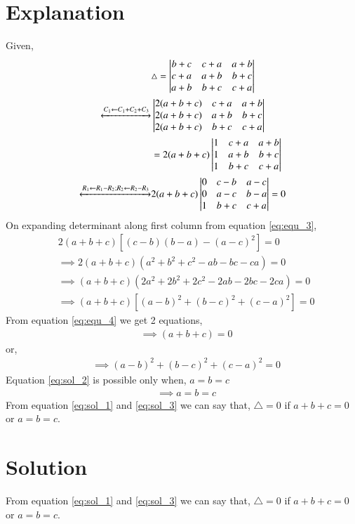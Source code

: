 \documentclass[journal,12pt,twocolumn]{IEEEtran}
\begin{document}
\section{Explanation}
Given,\\
\begin{align}
&\triangle = \begin{vmatrix}b+c & c+a & a+b\\c+a & a+b & b+c\\a+b&b+c & c+a\end{vmatrix} \label{eq:ques}\\
\xleftrightarrow[]{C_1\leftarrow C_1+C_2+C_3}
&\begin{vmatrix}2(a+b+c) & c+a & a+b\\2(a+b+c) & a+b & b+c\\2(a+b+c)&b+c & c+a\end{vmatrix} \label{eq:eq_1}\\
&=2(a+b+c)\begin{vmatrix}1 & c+a & a+b\\1 & a+b & b+c\\1&b+c & c+a\end{vmatrix} \label{eq:eq_2}\\
\xleftrightarrow[]{R_1\leftarrow R_1-R_2; R_2 \leftarrow R_2-R_3}
&2(a+b+c)\begin{vmatrix}0 & c-b & a-c\\0 & a-c & b-a\\1&b+c & c+a\end{vmatrix} =0 \label{eq:equ_3}
\end{align}
On expanding determinant along first column from equation \eqref{eq:equ_3},
\begin{align}
&2(a+b+c)[(c-b)(b-a)-(a-c)^{2}]=0\\
&\implies 2(a+b+c)(a^{2}+b^{2}+c^{2}-ab-bc-ca)=0 \\
&\implies (a+b+c)(2a^{2}+2b^{2}+2c^{2}-2ab-2bc-2ca)=0\\
&\implies (a+b+c)[(a-b)^{2}+(b-c)^{2}+(c-a)^{2}] = 0 \label{eq:equ_4}
\end{align}
From equation \eqref{eq:equ_4} we get 2 equations,
\begin{align}
&\implies \boxed{(a+b+c) = 0} \label{eq:sol_1}
\end{align}
or,
\begin{align}
&\implies (a-b)^{2}+(b-c)^{2}+(c-a)^{2} = 0 \label{eq:sol_2}
\end{align}
Equation \eqref{eq:sol_2} is possible only when, $a=b=c$
\begin{align}
&\implies \boxed{a=b=c} \label{eq:sol_3}
\end{align}
From equation \eqref{eq:sol_1} and \eqref{eq:sol_3} we can say that,
$\triangle=0$ if $a+b+c=0$ or $a=b=c$.
\section{Solution}

From equation \eqref{eq:sol_1} and \eqref{eq:sol_3} we can say that,
$\triangle=0$ if $a+b+c=0$ or $a=b=c$.

\\
\end{document}
